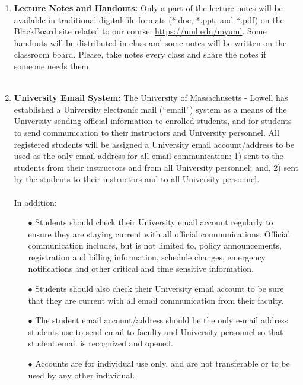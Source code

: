 \documentclass[10pt]{article}
\begin{document}
\begin{enumerate}
\begin{enumerate}[label=\alph*.]
         \item {\bf Lecture Notes and Handouts:}
           Only a part of the lecture notes will be available in
           traditional digital-file formats (*.doc, *.ppt, and *.pdf)
           on the BlackBoard site related to our course:
           \url{https://uml.edu/myuml}.  Some handouts 
           will be distributed in class and some notes will be written
           on the classroom board.  Please, take notes every class and
           share the notes if someone needs them.  \\\\
         \item {\bf University Email System:}
           The University of Massachusetts - Lowell has established a University
           electronic mail (``email'') system as a means of the University
           sending official information to enrolled students, and for
           students to send communication to their instructors and
           University personnel. All registered students will be
           assigned a University email account/address to be used as the
           only email address for all email communication: 1) sent to
           the students from their instructors and from all University
           personnel; and, 2) sent by the students to their
           instructors and to all University personnel. \\\\
           In addition:\\
           \begin{enumerate}
           \item[$\bullet$] Students should check their University email
             account regularly to ensure they are staying current with
             all official communications. Official communication
             includes, but is not limited to, policy announcements,
             registration and billing information, schedule changes,
             emergency notifications and other critical and time
             sensitive information.  
           \item[$\bullet$] Students should also check their University
             email account to be sure that they are current with all
             email communication from their faculty.  
           \item[$\bullet$] The student email account/address should be
             the only e-mail address students use to send email to
             faculty and University personnel so that student email is
             recognized and opened. 
           \item[$\bullet$] Accounts are for individual use
             only, and are not transferable or to be used by any other
             individual.  
           \end{enumerate}


\end{enumerate}
\end{enumerate}
\end{document}
